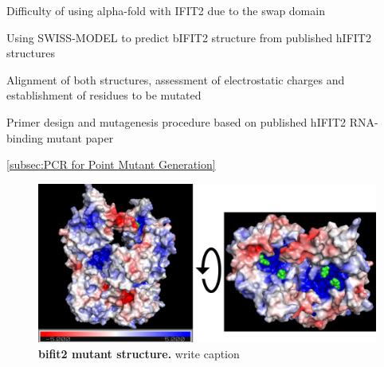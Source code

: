 Difficulty of using alpha-fold with IFIT2 due to the swap domain

Using SWISS-MODEL to predict bIFIT2 structure from published hIFIT2 structures

Alignment of both structures, assessment of electrostatic charges and establishment of residues to be mutated

Primer design and mutagenesis procedure based on published hIFIT2 RNA-binding mutant paper
\cite{Tran2020InfluenzaMRNAs}

\ref{subsec:PCR for Point Mutant Generation}

\begin{figure}
    \centering
    \includegraphics[width=1\linewidth]{09. Chapter 4/Figs/01. pIB/03. IFIT2/05. IFIT2-RNA binding mutant/01. Structure/01. structure.png}
    \caption[ifit2 mutant structure]{\textbf{bifit2 mutant structure.} write caption}
    \label{fig:ifit2 mutant structure}
\end{figure}






